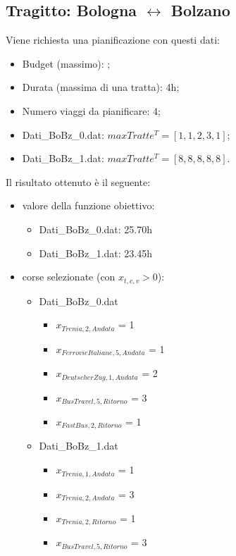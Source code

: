 \documentclass[main.tex]{subfiles}
\begin{document}
\subsection*{Tragitto: Bologna $\leftrightarrow$ Bolzano}
Viene richiesta una pianificazione con questi dati:
\begin{itemize}
    \item Budget (massimo): ;
    \item Durata (massima di una tratta): 4h;
    \item Numero viaggi da pianificare: 4;
    \item Dati\_BoBz\_0.dat: $maxTratte^T = [1,1,2,3,1]$;
    \item Dati\_BoBz\_1.dat: $maxTratte^T = [8,8,8,8,8]$.
\end{itemize}
Il risultato ottenuto è il seguente:
\begin{itemize}
    \item valore della funzione obiettivo:
    \begin{itemize}
        \item Dati\_BoBz\_0.dat: 25.70h
        \item Dati\_BoBz\_1.dat: 23.45h
    \end{itemize}
    \item corse selezionate (con $x_{t,c,v} > 0$):
    \begin{itemize}
        \item Dati\_BoBz\_0.dat
        \begin{itemize}
            \item $x_{Trenia,2,Andata}$ = 1
            \item $x_{FerrovieItaliane,5,Andata}$ = 1
            \item $x_{DeutscherZug,1,Andata}$ = 2
            \item $x_{BusTravel,5,Ritorno}$ = 3
            \item $x_{FastBus,2,Ritorno}$ = 1
        \end{itemize}
        \item Dati\_BoBz\_1.dat
        \begin{itemize}
            \item $x_{Trenia,1,Andata}$ = 1
            \item $x_{Trenia,2,Andata}$ = 3
            \item $x_{Trenia,2,Ritorno}$ = 1
            \item $x_{BusTravel,5,Ritorno}$ = 3
        \end{itemize}

\end{itemize}
\end{itemize}
\end{document}
